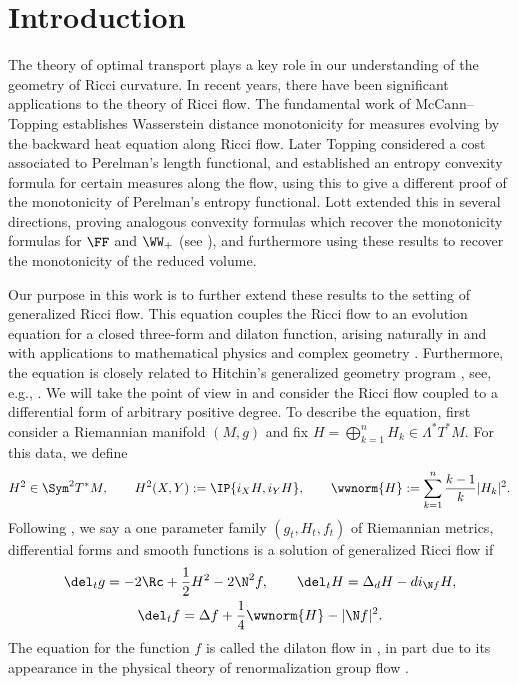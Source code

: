 \section{Introduction}

The theory of optimal transport plays a key role in our understanding of the geometry of Ricci curvature. In recent years, there have been significant applications to the theory of Ricci flow. The fundamental work of McCann--Topping \cite{McCannTopping} establishes Wasserstein distance monotonicity for measures evolving by the backward heat equation along Ricci flow. Later Topping \cite{ToppingOT} considered a cost associated to Perelman's length functional, and established an entropy convexity formula for certain measures along the flow, using this to give a different proof of the monotonicity of Perelman's entropy functional. Lott \cite{LottOTPRV} extended this in several directions, proving analogous convexity formulas which recover the monotonicity formulas for $\FF$ and $\WW_+$ (see \cite{FIN, Perelman1}), and furthermore using these results to recover the monotonicity of the reduced volume.

Our purpose in this work is to further extend these results to the setting of generalized Ricci flow. This equation couples the Ricci flow to an evolution equation for a closed three-form and dilaton function, arising naturally in and with applications to mathematical physics \cite{HeLiuGRF,OSW,Polchinski,StreetsTdual} and complex geometry \cite{JFS, StreetsPCFBI, PCF}. Furthermore, the equation is closely related to Hitchin's generalized geometry program \cite{AXu,GualtieriGKG,HitchinGCY}, see, e.g., \cite{MGFRicciflowTdual, GRFbook, GKRF}. We will take the point of view in \cite{Streetsscalar} and consider the Ricci flow coupled to a differential form of arbitrary positive degree. To describe the equation, first consider a Riemannian manifold $(M, g)$ and fix $H=\bigoplus_{k=1}^n H_k\in\Lambda^*T^*M$. For this data, we define
\begin{align*}
 H^2 \in \Sym^2 T^*M,\qquad H^2(X,Y) := \IP{i_X H, i_Y H}, \qquad \wwnorm{H}:= \sum_{k=1}^n\frac{k-1}k|H_k|^2.
\end{align*}
Following \cite{Streetsscalar}, we say a one parameter family $(g_t, H_t, f_t)$ of Riemannian metrics, differential forms and smooth functions is a solution of generalized Ricci flow if
\begin{gather*}
\del_tg= -2 \Rc + \frac12 H^2- 2 \N^2 f,\qquad
\del_t H= \Delta_dH-d i_{\N f}H,\\
\del_t f= \Delta f+\frac14 \wwnorm{H}-|\N f|^2.
\end{gather*}
The equation for the function $f$ is called the dilaton flow in \cite{Streetsscalar}, in part due to its appearance in the physical theory of renormalization group flow \cite{Polchinski}.

